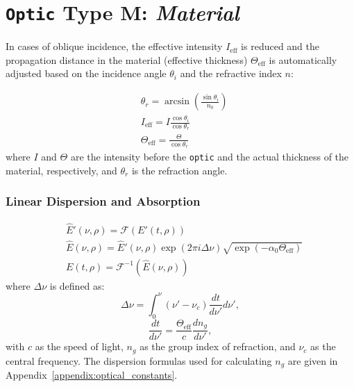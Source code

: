 \documentclass{report}
\begin{document}
\section{\texttt{Optic} Type M: \textit{Material}}

In cases of oblique incidence, the effective intensity \(I_{\text{eff}}\) is reduced and the propagation distance in the material (effective thickness) \(\Theta_{\text{eff}}\) is automatically adjusted based on the incidence angle \(\theta_i\) and the refractive index \(n\):

\begin{equation}
 \begin{aligned}
   &\theta_r = \arcsin\left(\frac{\sin\theta_i}{n_0}\right)\\
   &I_{\text{eff}} = I \frac{\cos\theta_i}{\cos\theta_r}\\
   &\Theta_{\text{eff}} = \frac{\Theta}{\cos\theta_r} 
 \end{aligned}
\end{equation}
where \(I\) and \(\Theta\) are the intensity before the \texttt{optic} and the actual thickness of the material, respectively, and \(\theta_r\) is the refraction angle.

\subsubsection{Linear Dispersion and Absorption}
\begin{equation}
 \begin{aligned}
  &\widehat{E}'(\nu,\rho) = \mathcal{F}(E'(t,\rho))\\
  &\widehat{E}(\nu,\rho) = \widehat{E}'(\nu,\rho) \exp (2 \pi i \Delta \nu) \sqrt{\exp(-\alpha_0 \Theta_{\text{eff}})}\\
  &E(t,\rho) = \mathcal{F}^{-1}(\widehat{E}(\nu,\rho))
 \end{aligned}
\end{equation}
where \(\Delta \nu\) is defined as:
\begin{equation}\label{eq:Delta_nu_disp}
 \Delta \nu = \int_0^{\nu} (\nu'-\nu_c) \frac{dt}{d\nu'} d\nu',
\end{equation}
\begin{equation}
 \frac{dt}{d\nu'} = \frac{\Theta_{\text{eff}}}{c} \frac{dn_{g}}{d\nu'},
\end{equation}
with \(c\) as the speed of light, \(n_{g}\) as the group index of refraction, and \(\nu_c\) as the central frequency. The dispersion formulas used for calculating \(n_{g}\) are given in Appendix~\ref{appendix:optical_constants}.
\end{document}
